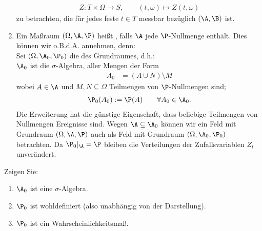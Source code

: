 \begin{bemerkungnr}
\begin{enumerate}[label=(\arabic*)]
		\begin{align*}
			Z:T\times\Omega\to S,\qquad (t,\omega)\mapsto Z(t,\omega)
		\end{align*}
		zu betrachten, die für jedes feste $t\in T$ messbar bezüglich $(\A,\B)$ ist.
		\item Ein Maßraum $(\Omega,\A,\P)$ heißt , falls $\A$ jede $\P$-Nullmenge enthält.
		Dies können wir o.B.d.A. annehmen, denn:\\
		Sei $(\Omega,\A_0,\P_0)$ die  des Grundraumes, d.h.: \\
		$\A_0$ ist die $\sigma$-Algebra, aller Mengen der Form
		\begin{align*}
			A_0&=(A\cup N)\setminus M
		\end{align*}
		wobei $A\in\A$ und $M,N\subseteq\Omega$ Teilmengen von $\P$-Nullmengen sind;
		\begin{align*}
			\P_0(A_0):=\P(A)\qquad\forall A_0\in\A_0.
		\end{align*}
		Die Erweiterung hat die günstige Eigenschaft, dass beliebige Teilmengen von Nullmengen Ereignisse sind.
		Wegen $\A\subseteq\A_0$ können wir ein Feld mit Grundraum $(\Omega,\A,\P)$ auch als Feld mit Grundraum $(\Omega,\A_0,\P_0)$ betrachten.
		Da $\P_0|_\A=\P$ bleiben die Verteilungen der Zufallsvariablen $Z_t$ unverändert.
	\end{enumerate}
\end{bemerkungnr}

\begin{aufgabenr}\label{aufg:3}\enter
	Zeigen Sie:
	\begin{enumerate}
		\item $\A_0$ ist eine $\sigma$-Algebra.
		\item $\P_0$ ist wohldefiniert (also unabhängig von der Darstellung).
		\item $\P_0$ ist ein Wahrscheinlichkeitsmaß.
	\end{enumerate}
\end{aufgabenr}

